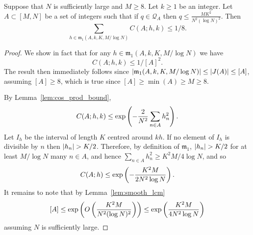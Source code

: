 \begin{lemma}\label{lem:minor1_bound}
Suppose that $N$ is sufficiently large and $M\geq 8$. Let $k\geq 1$ be an integer. Let $A\subset [M,N]$ be a set of integers such that if $q\in\mathcal{Q}_A$ then $q\leq \frac{MK^2}{N^2(\log N)^2}$. Then
\[\sum_{h\in \mathfrak{m}_1(A,k,K,M/\log N)} C(A;h,k)\leq 1/8.\]
\end{lemma}
\begin{proof}
We show in fact that for any $h\in \mathfrak{m}_1(A,k,K,M/\log N)$ we have
\[C(A;h,k)\leq 1/[A]^2.\]
The result then immediately follows since $\left\lvert \mathfrak{m}_1(A,k,K,M/\log N)\right\rvert\leq \left\lvert J(A)\right\rvert\leq [A]$, assuming $[A]\geq 8$, which is true since $[A]\geq \min(A)\geq M\geq 8$.

By Lemma~\ref{lem:cos_prod_bound},
\[C(A;h,k)\leq \exp\left( -\frac{2}{N^2}\sum_{n\in A}h_n^2\right).\]
Let $I_h$ be the interval of length $K$ centred around $kh$. If no element of $I_h$ is divisible by $n$ then $\left\lvert h_n\right\rvert>K/2$. Therefore, by definition of $\mathfrak{m}_1$, $\left\lvert h_n\right\rvert>K/2$ for at least $M/\log N$ many $n\in A$, and hence $\sum_{n\in A}h_n^2\geq K^2M/4\log N$, and so
\[C(A;h)\leq \exp\left( -\frac{K^2M}{2N^2\log N}\right).\]
It remains to note that by Lemma~\ref{lem:smooth_lcm}
\[[A]\leq \exp\left( O\left( \frac{K^2M}{N^2(\log N)^2}\right)\right)\leq \exp\left( \frac{K^2M}{4N^2\log N}\right)\]
assuming $N$ is sufficiently large.
\end{proof}

